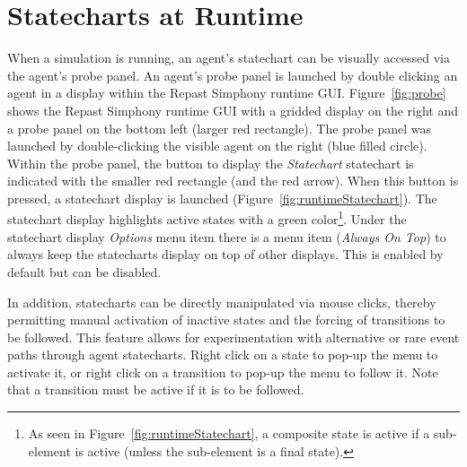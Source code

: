 \documentclass[11pt]{amsart}
\begin{document}
\section{Statecharts at Runtime}
\label{sec:runtime}
When a simulation is running, an agent's statechart can be visually accessed via the agent's probe panel. An agent's probe panel is launched by double clicking an agent in a display within the Repast Simphony runtime GUI. Figure~\ref{fig:probe} shows the Repast Simphony runtime GUI with a gridded display on the right and a probe panel on the bottom left (larger red rectangle). The probe panel was launched by double-clicking the visible agent on the right (blue filled circle). Within the probe panel, the button to display the \emph{Statechart} statechart is indicated with the smaller red rectangle (and the red arrow). When this button is pressed, a statechart display is launched (Figure~\ref{fig:runtimeStatechart}). The statechart display highlights active states with a green color\footnote{As seen in Figure~\ref{fig:runtimeStatechart}, a composite state is active if a sub-element is active (unless the sub-element is a final state).}. Under the statechart display \emph{Options} menu item there is a menu item (\emph{Always On Top}) to always keep the statecharts display on top of other displays. This is enabled by default but can be disabled.

In addition, statecharts can be directly manipulated via mouse clicks, thereby permitting manual activation of inactive states and the forcing of transitions to be followed. This feature allows for experimentation with alternative or rare event paths through agent statecharts. Right click on a state to pop-up the menu to activate it, or right click on a transition to pop-up the menu to follow it. Note that a transition must be active if it is to be followed.
\end{document}
